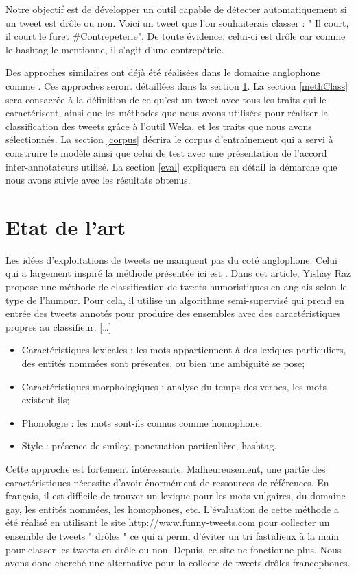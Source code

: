 \documentclass[10pt,a4paper,twoside]{article}
\begin{document}
Notre objectif est de développer un outil capable de détecter automatiquement si un tweet est drôle ou non. Voici un tweet que l’on souhaiterais classer : " Il court, il court le furet \#Contrepeterie".  De toute évidence, celui-ci est drôle car comme le hashtag le mentionne, il s'agit d'une contrepètrie. 

Des approches similaires ont déjà été réalisées dans le domaine anglophone comme \cite{Raz12, Barbosa2010}. Ces approches seront détaillées dans la section \ref{art}. La section \ref{methClass} sera consacrée à la définition de ce qu'est un tweet avec tous les traits qui le caractérisent, ainsi que les méthodes que nous avons utilisées pour réaliser la classification des tweets grâce à l'outil Weka, et les traits que nous avons sélectionnés. La section \ref{corpus} décrira le corpus d'entraînement qui a servi à construire le modèle ainsi que celui de test avec une présentation de l'accord inter-annotateurs utilisé. La section \ref{eval} expliquera en détail la démarche que nous avons suivie avec les résultats obtenus.




\section{Etat de l'art}
\label{art}
Les idées d’exploitations de tweets ne manquent pas du coté anglophone. Celui qui a largement inspiré la méthode présentée ici est \cite{Raz12}.  Dans cet article, Yishay Raz propose une méthode de classification de tweets humoristiques en anglais selon le type de l’humour. Pour cela, il utilise un algorithme semi-supervisé qui prend en entrée des tweets annotés pour produire des ensembles avec des caractéristiques propres au classifieur.  […]

\begin{itemize}
\item Caractéristiques lexicales : les mots appartiennent à des lexiques particuliers, des entités nommées sont présentes, ou bien une ambiguité se pose;
\item Caractéristiques morphologiques : analyse du temps des verbes, les mots existent-ils;
\item Phonologie : les mots sont-ils connus comme homophone;
\item Style : présence de smiley, ponctuation particulière, hashtag.
\end{itemize}
Cette approche est fortement intéressante. Malheureusement, une partie des caractéristiques nécessite d’avoir énormément de ressources de références. En français, il est difficile de trouver un lexique pour les mots vulgaires, du domaine gay, les entités nommées, les homophones, etc. 
L’évaluation de cette méthode a été réalisé en utilisant le site \url{ http://www.funny-tweets.com} pour collecter un ensemble de tweets " drôles " ce qui a permi d’éviter un tri fastidieux à la main pour classer les tweets en drôle ou non. Depuis, ce site ne fonctionne plus. Nous avons donc cherché une alternative pour la collecte de tweets drôles francophones.
\end{document}
